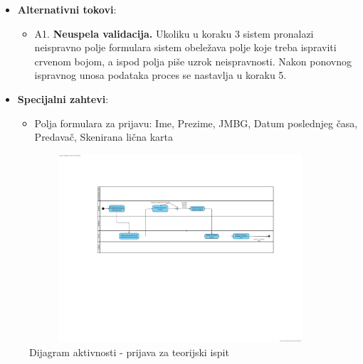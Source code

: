 \begin{itemize}
  \item \textbf{Alternativni tokovi}:
      \begin{itemize}
        \item A1. \textbf{Neuspela validacija.}
        Ukoliku u koraku 3 sistem pronalazi neispravno polje formulara sistem obeležava polje koje treba ispraviti crvenom bojom, 
        a ispod polja piše uzrok neispravnosti. Nakon ponovnog ispravnog unosa podataka proces se nastavlja u koraku 5.
      \end{itemize}
      
  \item \textbf{Specijalni zahtevi}:
      \begin{itemize}
        \item Polja formulara za prijavu: Ime, Prezime, JMBG, Datum poslednjeg časa, Predavač, Skenirana lična karta 
      \end{itemize}
\end{itemize}

\begin{figure}[H]
  \begin{center}
      \includegraphics[width=140mm, height=70mm]{Diagrams/prijava za polaganje teorijskog ispita.png}
  \end{center}
  \caption {Dijagram aktivnosti - prijava za teorijski ispit}
  \label{activity_prijava_za_teoriju}

\end{figure}
